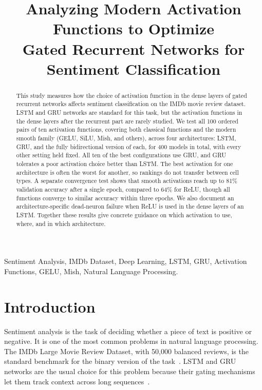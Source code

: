 \documentclass[conference]{IEEEtran}
\title{Analyzing Modern Activation Functions to Optimize\\
Gated Recurrent Networks for Sentiment Classification}
\author{\IEEEauthorblockN{Anonymous Authors}}
\begin{document}
\raggedbottom

\maketitle

\begin{abstract}
This study measures how the choice of activation function in
the dense layers of gated recurrent networks affects sentiment
classification on the IMDb movie review dataset. LSTM and GRU
networks are standard for this task, but the activation
functions in the dense layers after the recurrent part are rarely
studied. We test all 100 ordered pairs of ten activation functions,
covering both classical functions and the modern smooth family
(GELU, SiLU, Mish, and others), across four architectures: LSTM,
GRU, and the fully bidirectional version of each, for 400 models
in total, with every other setting held fixed. All ten of the best
configurations use GRU, and GRU tolerates a poor activation
choice better than LSTM. The best activation for one architecture
is often the worst for another, so rankings do not transfer
between cell types. A separate convergence test shows that smooth
activations reach up to 81\% validation accuracy after a single
epoch, compared to 64\% for ReLU, though all functions converge
to similar accuracy within three epochs. We also document an
architecture-specific dead-neuron failure when ReLU is used
in the dense layers of an LSTM. Together these results give
concrete guidance on which activation to use, where, and in
which architecture.
\end{abstract}

\begin{IEEEkeywords}
Sentiment Analysis, IMDb Dataset, Deep Learning, LSTM, GRU, Activation Functions, GELU, Mish, Natural Language Processing.
\end{IEEEkeywords}

\section{Introduction}

Sentiment analysis is the task of deciding whether a piece of
text is positive or negative. It is one of the most common
problems in natural language processing. The IMDb Large
Movie Review Dataset, with 50{,}000 balanced reviews, is the
standard benchmark for the binary version of the
task~\cite{maas2011}. LSTM and GRU networks are the usual
choice for this problem because their gating mechanisms let
them track context across long sequences~\cite{hochreiter1997,cho2014,chung2014}.
\end{document}
